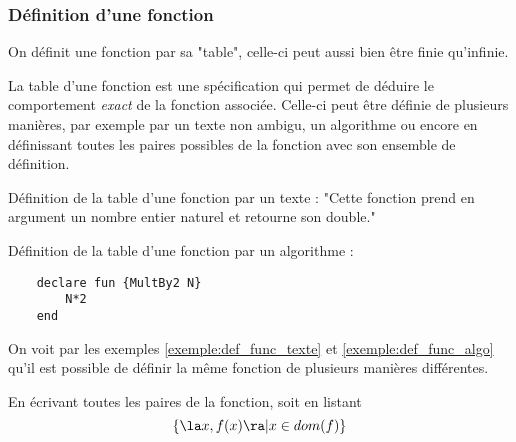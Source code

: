 \subsubsection{Définition d'une fonction}
\label{par:d_finition_d_une_fonciton}
On définit une fonction par sa "table", celle-ci peut aussi bien être finie qu'infinie.\\
\begin{mydef}
    La table d'une fonction est une spécification qui permet de déduire le comportement \emph{exact} de la fonction associée. Celle-ci peut être définie de plusieurs manières, par exemple par un texte non ambigu, un algorithme ou encore en définissant toutes les paires possibles de la fonction avec son ensemble de définition.
\end{mydef}

\begin{myexem}\label{exemple:def_func_texte}
  Définition de la table d'une fonction par un texte : "Cette fonction prend en argument un nombre entier naturel et retourne son double."
\end{myexem}

\begin{myexem}\label{exemple:def_func_algo}
  Définition de la table d'une fonction par un algorithme : 
  \begin{lstlisting}
    declare fun {MultBy2 N}
        N*2
    end
  \end{lstlisting}
  On voit par les exemples \ref{exemple:def_func_texte} et \ref{exemple:def_func_algo} qu'il est possible de définir la même fonction de plusieurs manières différentes.
\end{myexem}
\begin{myexem}
  En écrivant toutes les paires de la fonction, soit en listant $$ \{ \la x, f(x) \ra | x \in dom(f)\}$$
\end{myexem}

